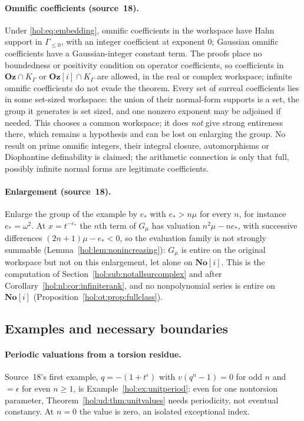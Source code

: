 \documentclass[11pt]{article}
\numberwithin{equation}{section}
\theoremstyle{definition}
\theoremstyle{remark}
\newcommand{\No}{\mathbf{No}}
\newcommand{\Oz}{\mathbf{Oz}}
\begin{document}
\paragraph{Omnific coefficients (source~18).}
Under \eqref{hol:eq:embedding}, omnific coefficients in the workspace have
Hahn support in $\Gamma_{\le0}$, with an integer coefficient at exponent $0$;
Gaussian omnific coefficients have a Gaussian-integer constant term. The
proofs place no boundedness or positivity condition on operator coefficients,
so coefficients in $\Oz\cap K_\Gamma$ or $\Oz[i]\cap K_\Gamma$ are allowed, in
the real or complex workspace; infinite omnific coefficients do not evade the
theorem. Every set of surreal coefficients lies in some set-sized workspace:
the union of their normal-form supports is a set, the group it generates is
set sized, and one nonzero exponent may be adjoined if needed. This chooses a
common workspace; it does \emph{not} give strong entireness there, which
remains a hypothesis and can be lost on enlarging the group. No result on
prime omnific integers, their integral closure, automorphisms or
Diophantine definability is claimed; the arithmetic connection is only that
full, possibly infinite normal forms are legitimate coefficients.

\paragraph{Enlargement (source~18).}
Enlarge the group of the example by $e_*$ with $e_*>n\mu$ for every $n$, for
instance $e_*=\omega^2$. At $x=t^{-e_*}$ the $n$th term of $G_\mu$ has
valuation $n^2\mu-ne_*$, with successive differences $(2n+1)\mu-e_*<0$, so the
evaluation family is not strongly summable
(Lemma~\ref{hol:lem:nonincreasing}): $G_\mu$ is entire on the original
workspace but not on this enlargement, let alone on $\No[i]$. This is the
computation of Section~\ref{hol:sub:notallsurcomplex} and after
Corollary~\ref{hol:nl:cor:infiniterank}, and no nonpolynomial series is
entire on $\No[i]$ (Proposition~\ref{hol:ot:prop:fullclass}).

\subsection{Examples and necessary boundaries}\label{hol:ud:sub:examples}

\paragraph{Periodic valuations from a torsion residue.}
Source~18's first example, $q=-(1+t^\epsilon)$ with $v(q^n-1)=0$ for odd $n$
and $=\epsilon$ for even $n\ge1$, is Example~\ref{hol:ex:unitperiod}: even
for one nontorsion parameter, Theorem~\ref{hol:ud:thm:unitvalues} needs
periodicity, not eventual constancy. At $n=0$ the value is zero, an isolated
exceptional index.
\end{document}
